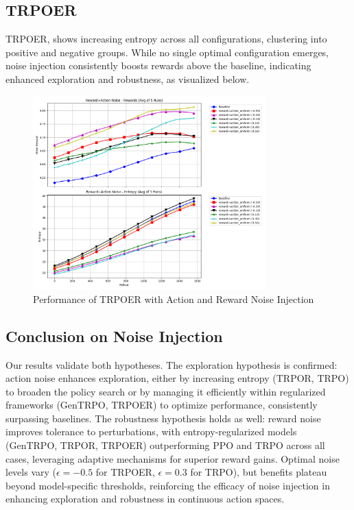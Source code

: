 \documentclass{svproc}
\begin{document}
\subsection{TRPOER}

TRPOER, shows increasing entropy across all configurations, clustering into positive and negative groups. While no single optimal configuration emerges, noise injection consistently boosts rewards above the baseline, indicating enhanced exploration and robustness, as visualized below.

\vspace*{-\baselineskip}
\begin{figure}[H]
    \centering
    \includegraphics[width=0.8\textwidth]{.assets/TRPOER_100000_reward_action_5_runs_resmoothed.png}
    \caption{Performance of TRPOER with Action and Reward Noise Injection}
\end{figure}
\vspace*{-\baselineskip}

\subsection{Conclusion on Noise Injection}

Our results validate both hypotheses. The exploration hypothesis is confirmed: action noise enhances exploration, either by increasing entropy (TRPOR, TRPO) to broaden the policy search or by managing it efficiently within regularized frameworks (GenTRPO, TRPOER) to optimize performance, consistently surpassing baselines. The robustness hypothesis holds as well: reward noise improves tolerance to perturbations, with entropy-regularized models (GenTRPO, TRPOR, TRPOER) outperforming PPO and TRPO across all cases, leveraging adaptive mechanisms for superior reward gains. Optimal noise levels vary (\(\epsilon = -0.5\) for TRPOER, \(\epsilon = 0.3\) for TRPO), but benefits plateau beyond model-specific thresholds, reinforcing the efficacy of noise injection in enhancing exploration and robustness in continuous action spaces.






\newpage



\end{document}
